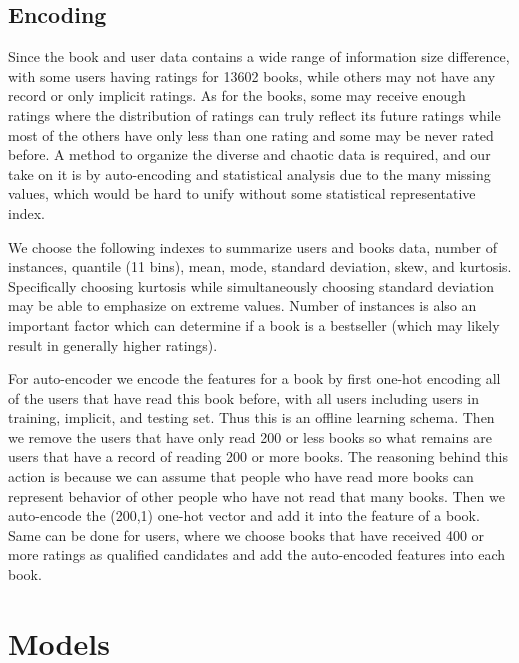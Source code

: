 \documentclass{article}
\begin{document}
\subsection*{Encoding}

Since the book and user data contains a wide range of information size difference, with some users having ratings for 13602 books, while others may not have any record or only implicit ratings. As for the books, some may receive enough ratings where the distribution of ratings can truly reflect its future ratings while most of the others have only less than one rating and some may be never rated before. A method to organize the diverse and chaotic data is required, and our take on it is by auto-encoding and statistical analysis due to the many missing values, which would be hard to unify without some statistical representative index.

We choose the following indexes to summarize users and books data, number of instances, quantile (11 bins), mean, mode, standard deviation, skew, and kurtosis. Specifically choosing kurtosis while simultaneously choosing standard deviation may be able to emphasize on extreme values. Number of instances is also an important factor which can determine if a book is a bestseller (which may likely result in generally higher ratings).

For auto-encoder we encode the features for a book by first one-hot encoding all of the users that have read this book before, with all users including users in training, implicit, and testing set. Thus this is an offline learning schema. Then we remove the users that have only read 200 or less books so what remains are users that have a record of reading 200 or more books. The reasoning behind this action is because we can assume that people who have read more books can represent behavior of other people who have not read that many books. Then we auto-encode the (200,1) one-hot vector and add it into the feature of a book. Same can be done for users, where we choose books that have received 400 or more ratings as qualified candidates and add the auto-encoded features into each book.

\section{Models}


\end{document}
